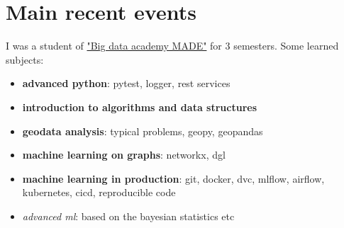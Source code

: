 \documentclass[letterpaper]{twentysecondcv} %
\begin{document}

\section{Main recent events}


I was a student of \href{https://data.vk.company/}{"Big data academy MADE"} for 3 semesters. Some learned subjects:
    {\begin{itemize}
        \item \textbf{advanced python}: pytest, logger, rest services
        \item \textbf{introduction to algorithms and data structures}
        \item \textbf{geodata analysis}: typical problems, geopy, geopandas
        \item \textbf{machine learning on graphs}: networkx, dgl
        \item \textbf{machine learning in production}: git, docker, dvc, mlflow, airflow, kubernetes, cicd, reproducible code
        \item \emph{advanced ml}: based on the bayesian statistics etc
    \end{itemize}
    }


\end{document}
